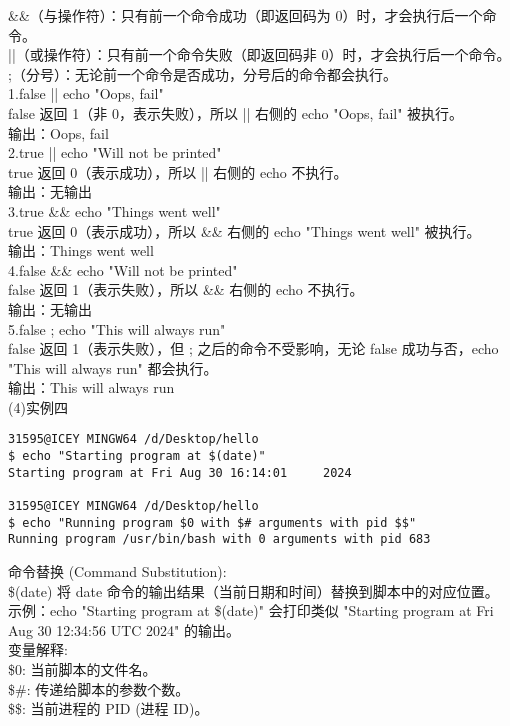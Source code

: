 \documentclass[a4paper, 12pt]{article}
\begin{document}
{\color{blue}
\&\&（与操作符）：只有前一个命令成功（即返回码为 0）时，才会执行后一个命令。\\
||（或操作符）：只有前一个命令失败（即返回码非 0）时，才会执行后一个命令。\\
;（分号）：无论前一个命令是否成功，分号后的命令都会执行。\\

1.false || echo "Oops, fail"\\
false 返回 1（非 0，表示失败），所以 || 右侧的 echo "Oops, fail" 被执行。\\
输出：Oops, fail\\

2.true || echo "Will not be printed"\\
true 返回 0（表示成功），所以 || 右侧的 echo 不执行。\\
输出：无输出\\

3.true \&\& echo "Things went well"\\
true 返回 0（表示成功），所以 \&\& 右侧的 echo "Things went well" 被执行。\\
输出：Things went well\\

4.false \&\& echo "Will not be printed"\\
false 返回 1（表示失败），所以 \&\& 右侧的 echo 不执行。\\
输出：无输出\\

5.false ; echo "This will always run"\\
false 返回 1（表示失败），但 ; 之后的命令不受影响，无论 false 成功与否，echo "This will always run" 都会执行。\\
输出：This will always run\\
}
(4)实例四
\begin{Verbatim}
31595@ICEY MINGW64 /d/Desktop/hello
$ echo "Starting program at $(date)"
Starting program at Fri Aug 30 16:14:01     2024

31595@ICEY MINGW64 /d/Desktop/hello
$ echo "Running program $0 with $# arguments with pid $$"
Running program /usr/bin/bash with 0 arguments with pid 683
\end{Verbatim}
{\color{blue}
命令替换 (Command Substitution):\\
\$(date) 将 date 命令的输出结果（当前日期和时间）替换到脚本中的对应位置。\\
示例：echo "Starting program at \$(date)" 会打印类似 "Starting program at Fri Aug 30 12:34:56 UTC 2024" 的输出。\\

变量解释:\\
\$0: 当前脚本的文件名。\\
\$\#: 传递给脚本的参数个数。\\
\$\$: 当前进程的 PID (进程 ID)。\\
}
\end{document}
